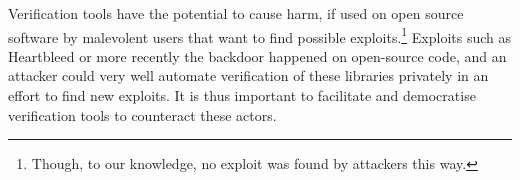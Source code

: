 Verification tools have the potential to cause harm, if used on open source software by malevolent users that want to find possible exploits.\footnote{Though, to our knowledge, no exploit was found by attackers this way.} Exploits such as Heartbleed \cite{heartbleedcve} or more recently the  backdoor \cite{xzutilscve} happened on open-source code, and an attacker could very well automate verification of these libraries privately in an effort to find new exploits. It is thus important to facilitate and democratise verification tools to counteract these actors.
